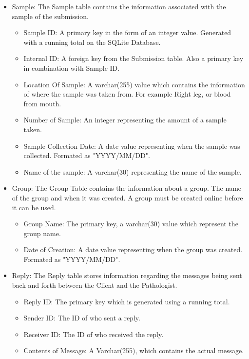 \documentclass[onecolumn, draftclsnofoot,10pt, compsoc]{IEEEtran}
\begin{document}
\begin{itemize}
\item Sample:\newline
The Sample table contains the information associated with the sample of the submission.
\begin{itemize}
\item Sample ID: A primary key in the form of an integer value. Generated with a running total on the SQLite Database.
\item Internal ID: A foreign key from the Submission table. Also a primary key in combination with Sample ID.
\item Location Of Sample: A varchar(255) value which contains the information of where the sample was taken from. For example Right leg, or blood from mouth.
\item Number of Sample: An integer representing the amount of a sample taken.
\item Sample Collection Date: A date value representing when the sample was collected. Formated as "YYYY/MM/DD".
\item Name of the sample: A varchar(30) representing the name of the sample.
\end{itemize}

\item Group:\newline
The Group Table contains the information about a group. The name of the group and when it was created. A group must be created online before it can be used.
\begin{itemize}
\item Group Name: The primary key, a varchar(30) value which represent the group name.
\item Date of Creation: A date value representing when the group was created. Formated as "YYYY/MM/DD".
\end{itemize}

\item Reply:\newline
The Reply table stores information regarding the messages being sent back and forth between the Client and the Pathologist.
\begin{itemize}
\item Reply ID: The primary key which is generated using a running total.
\item Sender ID: The ID of who sent a reply.
\item Receiver ID: The ID of who received the reply.
\item Contents of Message: A Varchar(255), which contains the actual message.
\end{itemize}


\end{itemize}
\end{document}
